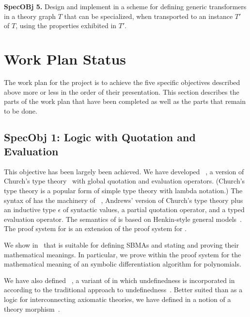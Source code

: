 \documentclass[fleqn]{llncs}
\begin{document}
\medskip

  \item[]\textbf{SpecOBj 5.} Design and implement in  a
    scheme for defining generic transformers in a theory graph $T$
    that can be specialized, when transported to an instance $T'$ of
    $T$, using the properties exhibited in $T'$.

\ei


\section{Work Plan Status}

The work plan for the project is to achieve the five specific
objectives described above more or less in the order of their
presentation.  This section describes the parts of the work plan that
have been completed as well as the parts that remain to be done.

\subsection*{SpecObj 1: Logic with Quotation and Evaluation}

This objective has been largely been achieved.  We have developed
{\churchqe}~\cite{Farmer18}, a version of Church's type
theory~\cite{Church40} with global quotation and evaluation operators.
(Church's type theory is a popular form of simple type theory with
lambda notation.)  The syntax of {\churchqe} has the machinery of
{\qzero}~\cite{Andrews02}, Andrews' version of Church's type theory
plus an inductive type $\epsilon$ of syntactic values, a partial
quotation operator, and a typed evaluation operator.  The semantics of
{\churchqe} is based on Henkin-style general models~\cite{Henkin50}.
The proof system for {\churchqe} is an extension of the proof system
for {\qzero}.

We show in~\cite{Farmer18} that {\churchqe} is suitable for defining
SBMAs and stating and proving their mathematical meanings.  In
particular, we prove within the proof system for {\churchqe} the
mathematical meaning of an symbolic differentiation algorithm for
polynomials.

We have also defined {\churchuqe}~\cite{Farmer17}, a variant of
{\churchqe} in which undefinedness is incorporated in {\churchqe}
according to the traditional approach to
undefinedness~\cite{Farmer04}.  Better suited than {\churchqe} as a
logic for interconnecting axiomatic theories, we have defined in
{\churchuqe} a notion of a theory morphism~\cite{Farmer17}.
\end{document}
